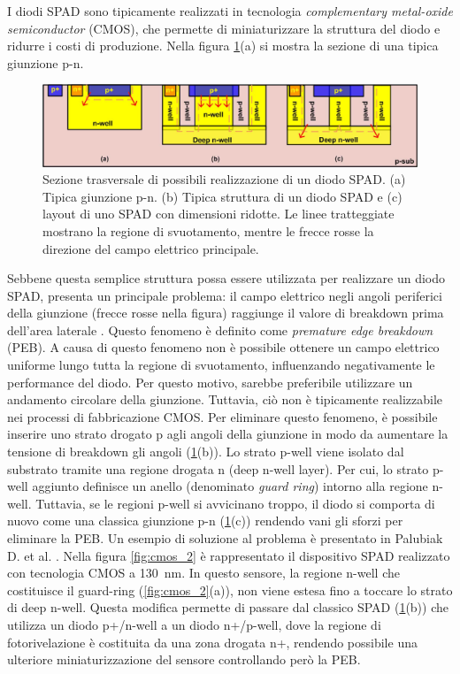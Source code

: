 I diodi SPAD sono tipicamente realizzati in tecnologia \textit{complementary metal-oxide semiconductor} (CMOS), che permette di miniaturizzare la struttura del diodo e ridurre i costi di produzione. Nella figura \ref{fig:cmos}(a) si mostra la sezione di una tipica giunzione p-n.
\begin{figure}[b]
	\centering
	\includegraphics[width=0.8\linewidth]{./ImageFiles/cmos.jpg}
	\caption{Sezione trasversale di possibili realizzazione di un diodo SPAD. (a) Tipica giunzione p-n. (b) Tipica struttura di un diodo SPAD e (c) layout di uno SPAD con dimensioni ridotte. Le linee tratteggiate mostrano la regione di svuotamento, mentre le frecce rosse la direzione del campo elettrico principale\cite{Palubiak2011}.}
	\label{fig:cmos}
\end{figure} 
Sebbene questa semplice struttura possa essere utilizzata per realizzare un diodo SPAD, presenta un principale problema: il campo elettrico negli angoli periferici della giunzione (frecce rosse nella figura) raggiunge il valore di breakdown prima dell'area laterale \cite{Palubiak2011}. Questo fenomeno è definito come \textit{premature edge breakdown} (PEB). A causa di questo fenomeno non è possibile ottenere un campo elettrico uniforme lungo tutta la regione di svuotamento, influenzando negativamente le performance del diodo. Per questo motivo, sarebbe preferibile utilizzare un andamento circolare della giunzione. Tuttavia, ciò non è tipicamente realizzabile nei processi di fabbricazione CMOS. Per eliminare questo fenomeno, è possibile inserire uno strato drogato p agli angoli della giunzione in modo da aumentare la tensione di breakdown gli angoli (\Fig\ref{fig:cmos}(b)). Lo strato p-well viene isolato dal substrato tramite una regione drogata n (deep n-well layer). Per cui, lo strato p-well aggiunto definisce un anello (denominato \textit{guard ring}) intorno alla regione n-well. Tuttavia, se le regioni p-well si avvicinano troppo, il diodo si comporta di nuovo come una classica giunzione p-n (\Fig\ref{fig:cmos}(c)) rendendo vani gli sforzi per eliminare la PEB. Un esempio di soluzione al problema è presentato in Palubiak D. et al. \cite{Palubiak2011}. Nella figura \ref{fig:cmos_2} è rappresentato il dispositivo SPAD realizzato con tecnologia CMOS a \SI{130}{\nano\meter}. In questo sensore, la regione n-well che costituisce il guard-ring (\Fig\ref{fig:cmos_2}(a)), non viene estesa fino a toccare lo strato di deep n-well. Questa modifica permette di passare dal classico SPAD (\Fig\ref{fig:cmos}(b)) che utilizza un diodo p+/n-well a un diodo n+/p-well, dove la regione di fotorivelazione è costituita da una zona drogata n+, rendendo possibile una ulteriore miniaturizzazione del sensore controllando però la PEB.
